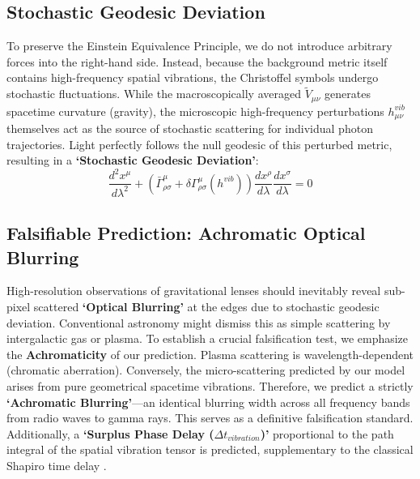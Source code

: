 \documentclass[reprint,amsmath,amssymb,aps,prd]{revtex4-2}
\begin{document}
\subsection{Stochastic Geodesic Deviation}
To preserve the Einstein Equivalence Principle, we do not introduce arbitrary forces into the right-hand side.
Instead, because the background metric itself contains high-frequency spatial vibrations, the Christoffel symbols undergo stochastic fluctuations.
While the macroscopically averaged $\tilde{V}_{\mu\nu}$ generates spacetime curvature (gravity), the microscopic high-frequency perturbations $h_{\mu\nu}^{vib}$ themselves act as the source of stochastic scattering for individual photon trajectories.
Light perfectly follows the null geodesic of this perturbed metric, resulting in a \textbf{`Stochastic Geodesic Deviation'}:
\begin{equation}
\frac{d^2 x^\mu}{d\lambda^2} + \left( \bar{\Gamma}^\mu_{\rho\sigma} + \delta \Gamma^\mu_{\rho\sigma}(h^{vib}) \right) \frac{dx^\rho}{d\lambda} \frac{dx^\sigma}{d\lambda} = 0
\end{equation}

\subsection{Falsifiable Prediction: Achromatic Optical Blurring}
High-resolution observations of gravitational lenses should inevitably reveal sub-pixel scattered \textbf{`Optical Blurring'} at the edges due to stochastic geodesic deviation.
Conventional astronomy might dismiss this as simple scattering by intergalactic gas or plasma.
To establish a crucial falsification test, we emphasize the \textbf{Achromaticity} of our prediction. Plasma scattering is wavelength-dependent (chromatic aberration).
Conversely, the micro-scattering predicted by our model arises from pure geometrical spacetime vibrations.
Therefore, we predict a strictly \textbf{`Achromatic Blurring'}---an identical blurring width across all frequency bands from radio waves to gamma rays.
This serves as a definitive falsification standard.
Additionally, a \textbf{`Surplus Phase Delay ($\Delta t_{vibration}$)'} proportional to the path integral of the spatial vibration tensor is predicted, supplementary to the classical Shapiro time delay \cite{Shapiro1964}.
\end{document}
